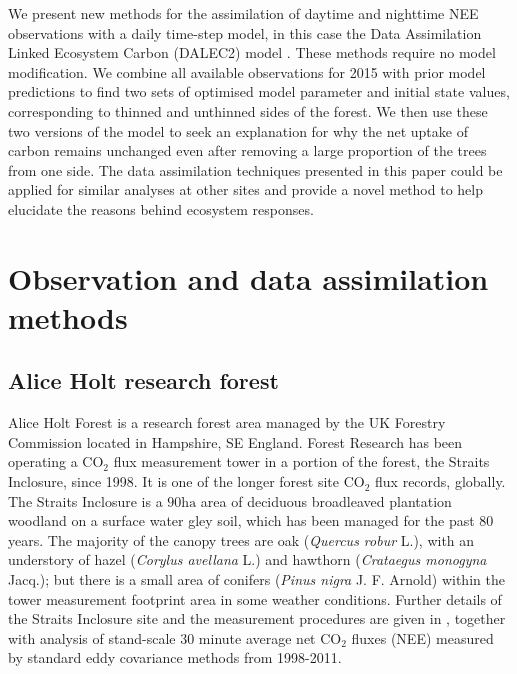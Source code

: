 \documentclass[11pt]{article}
\begin{document}
We present new methods for the assimilation of daytime and nighttime NEE observations with a daily time-step model, in this case the Data Assimilation Linked Ecosystem Carbon (DALEC2) model \citep{Bloom2015}. These methods require no model modification. We combine all available observations for 2015 with prior model predictions to find two sets of optimised model parameter and initial state values, corresponding to thinned and unthinned sides of the forest. We then use these two versions of the model to seek an explanation for why the net uptake of carbon remains unchanged even after removing a large proportion of the trees from one side. The data assimilation techniques presented in this paper could be applied for similar analyses at other sites and provide a novel method to help elucidate the reasons behind ecosystem responses.      

\section{Observation and data assimilation methods}

\subsection{Alice Holt research forest} \label{sec:site_description}

Alice Holt Forest is a research forest area managed by the UK Forestry Commission located in Hampshire, SE England. Forest Research has been operating a $\text{CO}_{2}$ flux measurement tower in a portion of the forest, the Straits Inclosure, since 1998. It is one of the longer forest site $\text{CO}_2$ flux records, globally. The Straits Inclosure is a $90 \text{ha}$ area of deciduous broadleaved plantation woodland on a surface water gley soil, which has been managed for the past 80 years. The majority of the canopy trees are oak (\textit{Quercus robur} L.), with an understory of hazel (\textit{Corylus avellana} L.) and hawthorn (\textit{Crataegus monogyna} Jacq.); but there is a small area of conifers (\textit{Pinus nigra} J. F. Arnold) within the tower measurement footprint area in some weather conditions. Further details of the Straits Inclosure site and the measurement procedures are given in \citet{wilkinson2012inter}, together with analysis of stand-scale $30$ minute average net $\text{CO}_{2}$ fluxes (NEE) measured by standard eddy covariance methods from 1998-2011. 
\end{document}
